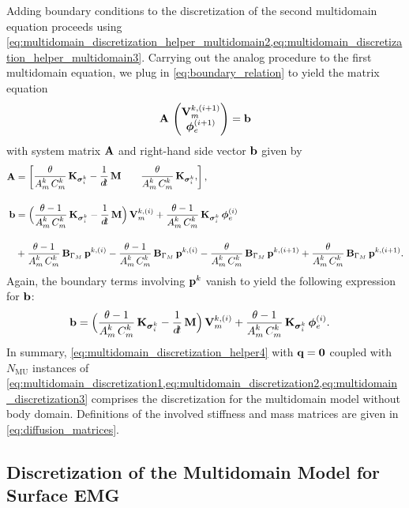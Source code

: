 Adding boundary conditions to the discretization of the second multidomain equation proceeds using \cref{eq:multidomain_discretization_helper_multidomain2,eq:multidomain_discretization_helper_multidomain3}.
Carrying out the analog procedure to the first multidomain equation, we plug in \cref{eq:boundary_relation} to yield the matrix equation
\begin{align}\label{eq:multidomain_discretization1}
  \textbf{A}\,\left(\begin{matrix}\textbf{V}_m^{k,(i+1)}\\ \boldsymbol{\phi}_{e}^{(i+1)}\end{matrix}\right) = \textbf{b}
\end{align}
%
with system matrix $\textbf{A}$ and right-hand side vector $\textbf{b}$ given by
%
\begin{align}
 \bfA &= \matt{
    \dfrac{\theta}{A_m^k\,C_m^k}\bfK_{\bfsigma_i^k} -\dfrac{1}{\dt}\bfM & \quad
    \dfrac{\theta}{A_m^k\,C_m^k}\bfK_{\bfsigma_i^k},
  },\label{eq:multidomain_discretization2} \\[4mm]
  \bfb &= \Big( \dfrac{\theta-1}{A_m^k\,C_m^k}\bfK_{\bfsigma_i^k} - \dfrac{1}{\dt}\bfM\Big)\,\bfV_m^{k,(i)} 
    + \dfrac{\theta - 1}{A_m^k\,C_m^k}\bfK_{\bfsigma_i^k}\,\bfphi_e^{(i)}\nonumber \\[4mm]
  & +\dfrac{\theta-1}{A_m^k\,C_m^k}\bfB_{\Gamma_M}\,\bfp^{k,(i)} - \dfrac{\theta-1}{A_m^k\,C_m^k}\bfB_{\Gamma_M}\,\bfp^{k,(i)}
  -\dfrac{\theta}{A_m^k\,C_m^k}\bfB_{\Gamma_M}\,\bfp^{k,(i+1)} + \dfrac{\theta}{A_m^k\,C_m^k}\bfB_{\Gamma_M}\,\bfp^{k,(i+1)}.\nonumber 
\end{align}
Again, the boundary terms involving $\textbf{p}^k$ vanish to yield the following expression for $\textbf{b}$:%
\begin{align}\label{eq:multidomain_discretization3}
    \bfb &= \Big( \dfrac{\theta-1}{A_m^k\,C_m^k}\bfK_{\bfsigma_i^k} - \dfrac{1}{\dt}\bfM\Big)\,\bfV_m^{k,(i)} 
      + \dfrac{\theta - 1}{A_m^k\,C_m^k}\bfK_{\bfsigma_i^k}\,\bfphi_e^{(i)}.
\end{align}
In summary, \cref{eq:multidomain_discretization_helper4} with $\textbf{q}=\textbf{0}$ coupled with $N_\text{MU}$  instances of \cref{eq:multidomain_discretization1,eq:multidomain_discretization2,eq:multidomain_discretization3} comprises the discretization for the multidomain model without body domain. Definitions of the involved stiffness and mass matrices are given in \cref{eq:diffusion_matrices}.

\subsection{Discretization of the Multidomain Model for Surface EMG}\label{sec:discretization_body_domain}

